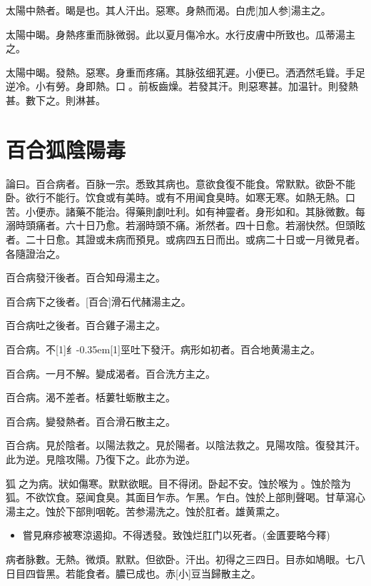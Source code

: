 \documentclass[oneside,b4paper]{ctexbook}
\begin{document}
\begin{flushleft}
太陽中熱者。暍是也。其人汗出。惡寒。身熱而渴。白虎[加人参]湯主之。

太陽中暍。身熱疼重而脉微弱。此以夏月傷冷水。水行皮膚中所致也。瓜蒂湯主之。

太陽中暍。發熱。惡寒。身重而疼痛。其脉弦细芤遲。小便已。洒洒然毛聳。手足逆冷。小有勞。身即熱。口{𫔭}。前板齒燥。若發其汗。則惡寒甚。加温针。則發熱甚。數下之。則淋甚。

\chapter{百合狐陰陽毒}

論曰。百合病者。百脉一宗。悉致其病也。意欲食復不能食。常默默。欲卧不能卧。欲行不能行。饮食或有美時。或有不用闻食臭時。如寒无寒。如熱无熱。口苦。小便赤。諸藥不能治。得藥則劇吐利。如有神靈者。身形如和。其脉微數。每溺時頭痛者。六十日乃愈。若溺時頭不痛。淅然者。四十日愈。若溺快然。但頭眩者。二十日愈。其證或未病而預見。或病四五日而出。或病二十日或一月微見者。各隨證治之。

百合病發汗後者。百合知母湯主之。

百合病下之後者。[百合]滑石代赭湯主之。

百合病吐之後者。百合雞子湯主之。

百合病。不{\hbox{\scalebox{0.68}[1]{纟}\kern-0.35em\scalebox{0.64}[1]{巠}}}吐下發汗。病形如初者。百合地黄湯主之。

百合病。一月不解。變成渴者。百合洗方主之。

百合病。渴不差者。栝蔞牡蛎散主之。

百合病。變發熱者。百合滑石散主之。

百合病。見於陰者。以陽法救之。見於陽者。以陰法救之。見陽攻陰。復發其汗。此为逆。見陰攻陽。乃復下之。此亦为逆。

狐{𧌒}之为病。狀如傷寒。默默欲眠。目不得闭。卧起不安。蚀於喉为{𧌒}。蚀於陰为狐。不欲饮食。惡闻食臭。其面目乍赤。乍黑。乍白。蚀於上部則聲喝。甘草瀉心湯主之。蚀於下部則咽乾。苦参湯洗之。蚀於肛者。雄黄熏之。

\begin{itemize}
\item 嘗見麻疹被寒涼遏抑。不得透發。致蚀烂肛门以死者。(金匱要略今釋)
\end{itemize}

病者脉數。无熱。微煩。默默。但欲卧。汗出。初得之三四日。目赤如鳩眼。七八日目四眥黑。若能食者。膿已成也。赤[小]豆当歸散主之。


\end{flushleft}
\end{document}
